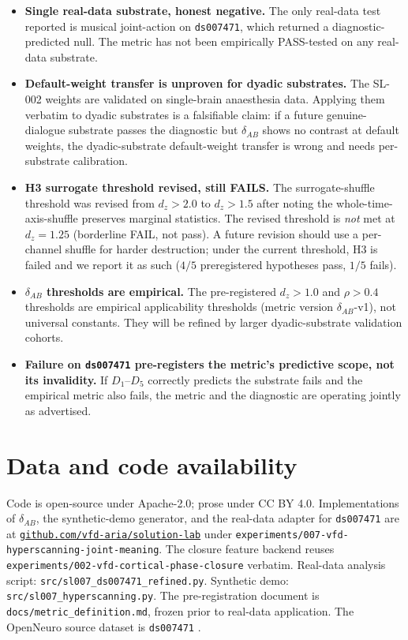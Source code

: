 \documentclass[11pt,a4paper]{article}
\begin{document}
\begin{itemize}\itemsep0pt
\item \textbf{Single real-data substrate, honest negative.} The only real-data test reported is musical joint-action on \texttt{ds007471}, which returned a diagnostic-predicted null. The metric has not been empirically PASS-tested on any real-data substrate.
\item \textbf{Default-weight transfer is unproven for dyadic substrates.} The SL-002 weights are validated on single-brain anaesthesia data. Applying them verbatim to dyadic substrates is a falsifiable claim: if a future genuine-dialogue substrate passes the diagnostic but $\delta_{AB}$ shows no contrast at default weights, the dyadic-substrate default-weight transfer is wrong and needs per-substrate calibration.
\item \textbf{H3 surrogate threshold revised, still FAILS.} The surrogate-shuffle threshold was revised from $d_z > 2.0$ to $d_z > 1.5$ after noting the whole-time-axis-shuffle preserves marginal statistics. The revised threshold is \emph{not} met at $d_z = 1.25$ (borderline FAIL, not pass). A future revision should use a per-channel shuffle for harder destruction; under the current threshold, H3 is failed and we report it as such ($4/5$ preregistered hypotheses pass, $1/5$ fails).
\item \textbf{$\delta_{AB}$ thresholds are empirical.} The pre-registered $d_z > 1.0$ and $\rho > 0.4$ thresholds are empirical applicability thresholds (metric version $\delta_{AB}$-v1), not universal constants. They will be refined by larger dyadic-substrate validation cohorts.
\item \textbf{Failure on \texttt{ds007471} pre-registers the metric's predictive scope, not its invalidity.} If $D_1$--$D_5$ correctly predicts the substrate fails and the empirical metric also fails, the metric and the diagnostic are operating jointly as advertised.
\end{itemize}

\section{Data and code availability}\label{sec:data}

Code is open-source under Apache-2.0; prose under CC BY 4.0. Implementations of $\delta_{AB}$, the synthetic-demo generator, and the real-data adapter for \texttt{ds007471} are at \href{https://github.com/vfd-aria/solution-lab}{\texttt{github.com/vfd-aria/solution-lab}} under \texttt{experiments/007-vfd-hyperscanning-joint-meaning}. The closure feature backend reuses \texttt{experiments/002-vfd-cortical-phase-closure} verbatim. Real-data analysis script: \texttt{src/sl007\_ds007471\_refined.py}. Synthetic demo: \texttt{src/sl007\_hyperscanning.py}. The pre-registration document is \texttt{docs/metric\_definition.md}, frozen prior to real-data application. The OpenNeuro source dataset is \texttt{ds007471} \citep{ZhouHyperscanning2026}.
\end{document}
